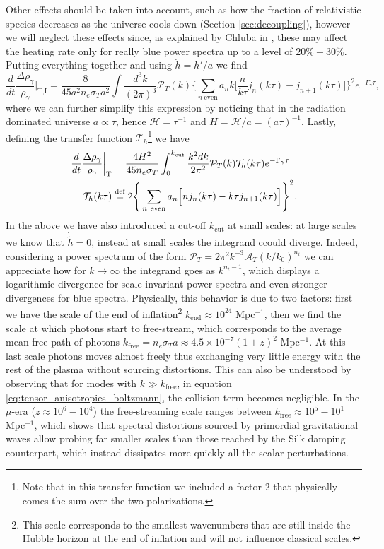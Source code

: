 Other effects should be taken into account, such as how the fraction of relativistic species decreases as the universe cools down (Section \ref{sec:decoupling}), however we will neglect these effects since, as explained by Chluba in \cite{Chluba_tens_diss}, these may affect the heating rate only for really blue power spectra up to a level of $20\%-30\%$.\\
Putting everything together and using $\dot h=h'/a$ we find
$$
    \frac{d}{dt}\frac{\Delta\rho_\gamma}{\rho_\gamma}\bigg|_\text{T,I}=\frac{8}{45a^2n_e\sigma_Ta^2}\int\frac{d^3k}{(2\pi)^3}\mathcal{P}_T (k)\Bigg\{\sum_{n\ \text{even}}a_nk\bigg[\frac{n}{k\tau}j_n(k\tau)-j_{n+1}(k\tau)\bigg]\Bigg\}^2e^{-\Gamma_\gamma\tau},
$$
where we can further simplify this expression by noticing that in the radiation dominated universe $a\propto\tau$, hence $\mathcal H=\tau^{-1}$ and $H=\mathcal{H}/a=(a\tau)^{-1}$. Lastly, defining the transfer function $\mathcal T_h$\footnote{Note that in this transfer function we included a factor 2 that physically comes the sum over the two polarizations.} we have
\begin{align}
    \label{eq:tightCoupling_tensor_heatingRate}
     \frac{d}{dt}\frac{\Delta\rho_\gamma}{\rho_\gamma}\bigg|_\text{T}&=\frac{4H^2}{45n_e\sigma_T}\int_0^{k_\text{cut}}\frac{k^2dk}{2\pi^2}\mathcal{P}_T (k)\mathcal{T}_h(k\tau)e^{-\Gamma_\gamma\tau}\\
    \mathcal{T}_h(k\tau)&\defeq 2\Bigg\{\sum_{n\ \text{even}}a_n\Big[nj_n(k\tau)-k\tau j_{n+1}(k\tau)\Big]\Bigg\}^2.\nonumber
\end{align}
In the above we have also introduced a cut-off $k_\text{cut}$ at small scales: at large scales we know that $\dot{\tilde h}=0$, instead at small scales the integrand ccould diverge. Indeed, considering a power spectrum of the form $\mathcal{P}_T=2\pi^2k^{-3}\mathcal A_T(k/k_0)^{n_t}$ we can appreciate how for $k\to\infty$ the integrand goes as $k^{n_t-1}$, which displays a logarithmic divergence for scale invariant power spectra and even stronger divergences for blue spectra. Physically, this behavior is due to two factors: first we have the scale of the end of inflation\footnote{This scale corresponds to the smallest wavenumbers that are still inside the Hubble horizon at the end of inflation and will not influence classical scales.} $k_\text{end}\approx 10^{24}$ Mpc$^{-1}$, then we find the scale at which photons start to free-stream, which corresponds to the average mean free path of photons $k_\text{free}=n_e\sigma_Ta\approx4.5\times10^{-7}(1+z)^2$ Mpc$^{-1}$. At this last scale photons moves almost freely thus exchanging very little energy with the rest of the plasma without sourcing distortions. This can also be understood by observing that for modes with $k\gg k_\text{free}$, in equation \eqref{eq:tensor_anisotropies_boltzmann}, the collision term becomes negligible.  In the $\mu$-era ($z\approx10^6-10^4 $) the free-streaming scale ranges between $k_\text{free}\approx 10^{5}-10^{1}$ Mpc$^{-1}$, which shows that spectral distortions sourced by primordial gravitational waves allow probing far smaller scales than those reached by the Silk damping counterpart, which instead dissipates more quickly all the scalar perturbations. 

